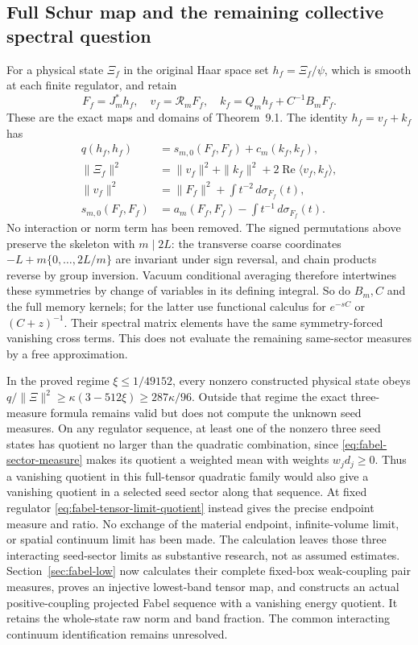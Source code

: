 \subsection{Full Schur map and the remaining collective spectral question}
For a physical state $\Xi_f$ in the original Haar space set
$h_f=\Xi_f/\psi$, which is smooth at each finite regulator, and retain
\[
 F_f=J_m^*h_f,\quad
 v_f=\mathcal R_mF_f,\quad
 k_f=Q_mh_f+C^{-1}B_mF_f.
\]
These are the exact maps and domains of Theorem~9.1.
The identity $h_f=v_f+k_f$ has
\begin{align*}
 q(h_f,h_f)&=s_{m,0}(F_f,F_f)+c_m(k_f,k_f),\\
 \|\Xi_f\|^2&=\|v_f\|^2+\|k_f\|^2
                         +2\operatorname{Re}\langle v_f,k_f\rangle,\\
 \|v_f\|^2&=\|F_f\|^2+\int t^{-2}\,d\sigma_{F_f}(t),\\
 s_{m,0}(F_f,F_f)&=a_m(F_f,F_f)-\int t^{-1}\,d\sigma_{F_f}(t).
\end{align*}
No interaction or norm term has been removed.
The signed permutations above preserve the skeleton with $m\mid2L$:
the transverse coarse coordinates $-L+m\{0,\ldots,2L/m\}$ are invariant
under sign reversal, and chain products reverse by group inversion.
Vacuum conditional averaging therefore intertwines these symmetries by
change of variables in its defining integral. So do $B_m,C$ and the
full memory kernels; for the latter use functional calculus for
$e^{-sC}$ or $(C+z)^{-1}$. Their spectral matrix elements have the same
symmetry-forced vanishing cross terms. This does not evaluate the
remaining same-sector measures by a free approximation.

In the proved regime $\xi\le1/49152$, every nonzero constructed physical
state obeys $q/\|\Xi\|^2\ge\kappa(3-512\xi)\ge287\kappa/96$.
Outside that regime the exact three-measure formula remains valid but
does not compute the unknown seed measures. On any regulator sequence,
at least one of the nonzero three seed states has quotient no larger
than the quadratic combination, since \eqref{eq:fabel-sector-measure}
makes its quotient a weighted mean with weights $w_jd_j\ge0$.
Thus a vanishing quotient in this full-tensor quadratic family would
also give a vanishing quotient in a selected seed sector along that
sequence. At fixed regulator \eqref{eq:fabel-tensor-limit-quotient}
instead gives the precise endpoint measure and ratio. No exchange of
the material endpoint, infinite-volume limit, or spatial continuum
limit has been made. The calculation leaves those three interacting
seed-sector limits as substantive research, not as assumed estimates.
Section~\ref{sec:fabel-low} now calculates their complete fixed-box
weak-coupling pair measures, proves an injective lowest-band tensor map,
and constructs an actual positive-coupling projected Fabel sequence with
a vanishing energy quotient. It retains the whole-state raw norm and
band fraction. The common interacting continuum identification remains
unresolved.
